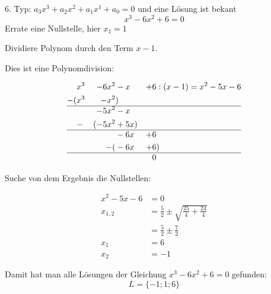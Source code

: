 \documentclass[
  ignorenonframetext,
  aspectratio=169,
]{beamer}
\begin{document}
\begin{frame}
\begin{block}{6. Typ: \(a_3x^3+a_2x^2+a_1x^1+a_0=0\) und eine Lösung ist
bekant}
\label{typ-a_3x3a_2x2a_1x1a_00-und-eine-luxf6sung-ist-bekant}
\[
 x^3-6x^2+6 = 0
\] Errate eine Nullstelle, hier \(x_1=1\)

Dividiere Polynom durch den Term \(x-1\).

Dies ist eine Polynomdivision:

\[
\begin{aligned}
&x^3&-6x^2  &-x &+6 &: (x-1)= x^2 -5x -6 \\
-(&x^3&-x^2&)\\ \hline
& &-5x^2&-x\\
& -&(-5x^2 &+5x)\\ \hline
&  &  &-6x &+6\\
&  &  -(&-6x & +6&) \\ \hline
&  &  &    &0
\end{aligned}
\]
\end{block}
\end{frame}

\begin{frame}
Suche von dem Ergebnis die Nullstellen:

\[
\begin{aligned}
x^2 -5x -6 &= 0\\
x_{1,2}&= \frac{5}{2} \pm \sqrt{\frac{25}{4}+\frac{24}{4}}\\
&= \frac{5}{2} \pm \frac{7}{2}\\
x_1 &= 6\\
x_2 &= -1
\end{aligned}
\]

Damit hat man alle Lösungen der Gleichung \(x^3-6x^2+6= 0\) gefunden:\\
\[ L=\{ -1; 1; 6\}\]
\end{frame}
\end{document}
